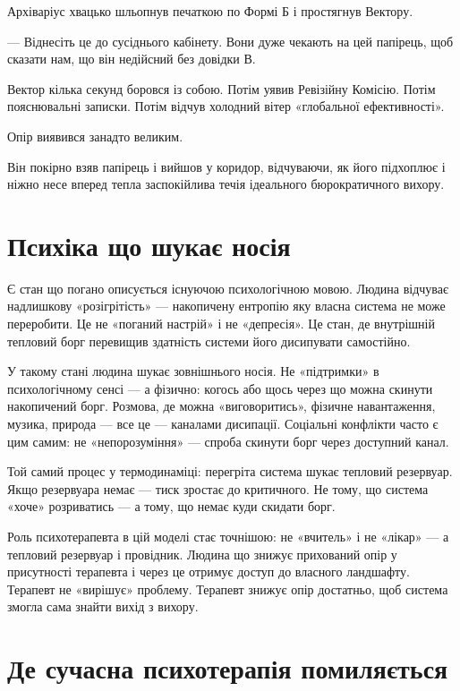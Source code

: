 \documentclass[12pt, a4paper, openany]{book}
\begin{document}
\begin{terrybox}
\medskip
Архіваріус хвацько шльопнув печаткою по Формі Б і простягнув Вектору.

--- Віднесіть це до сусіднього кабінету. Вони дуже чекають на цей папірець, щоб сказати нам, що він недійсний без довідки В.

Вектор кілька секунд боровся із собою. Потім уявив Ревізійну Комісію. Потім пояснювальні записки. Потім відчув холодний вітер «глобальної ефективності».

Опір виявився занадто великим.

Він покірно взяв папірець і вийшов у коридор, відчуваючи, як його підхоплює і ніжно несе вперед тепла заспокійлива течія ідеального бюрократичного вихору.
\end{terrybox}

\section{Психіка що шукає носія}

Є стан що погано описується існуючою психологічною мовою. Людина відчуває надлишкову «розігрітість» --- накопичену ентропію яку власна система не може переробити. Це не «поганий настрій» і не «депресія». Це стан, де внутрішній тепловий борг перевищив здатність системи його дисипувати самостійно.

У такому стані людина шукає зовнішнього носія. Не «підтримки» в психологічному сенсі --- а фізично: когось або щось через що можна скинути накопичений борг. Розмова, де можна «виговоритись», фізичне навантаження, музика, природа --- все це — каналами дисипації. Соціальні конфлікти часто є цим самим: не «непорозуміння» --- спроба скинути борг через доступний канал.

\begin{analogybox}
Той самий процес у термодинаміці: перегріта система шукає тепловий резервуар. Якщо резервуара немає --- тиск зростає до критичного. Не тому, що система «хоче» розриватись --- а тому, що немає куди скидати борг.
\end{analogybox}

Роль психотерапевта в цій моделі стає точнішою: не «вчитель» і не «лікар» --- а тепловий резервуар і провідник. Людина що знижує прихований опір у присутності терапевта і через це отримує доступ до власного ландшафту. Терапевт не «вирішує» проблему. Терапевт знижує опір достатньо, щоб система змогла сама знайти вихід з вихору.

\section{Де сучасна психотерапія помиляється}
\end{document}
